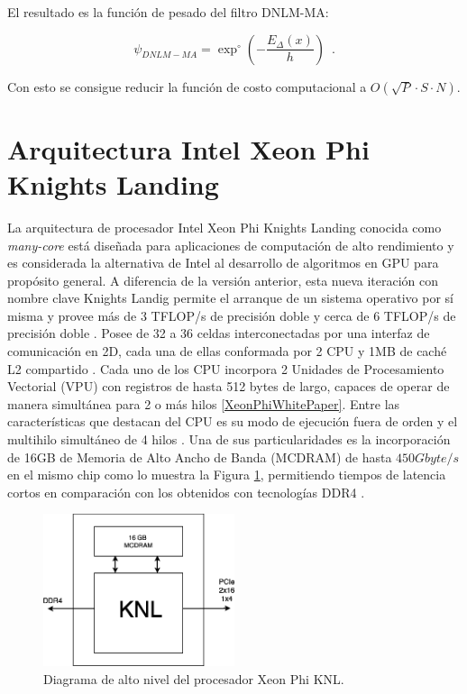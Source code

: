 {El resultado es la funci\'on de pesado del filtro DNLM-MA: 

\begin{equation}
\psi_{DNLM-MA}=\exp^{\circ}\left(-\frac{ E_\Delta\left(x\right) }{h}\right)  \enspace .
\label{eq:wmoas}
\end{equation}


Con esto se consigue reducir la  funci\'on de costo computacional a $O(\sqrt{P} \cdot S \cdot N)$.  



\section{Arquitectura Intel Xeon Phi Knights Landing}
\label{ch:marco_xeonphi}

La arquitectura de procesador Intel Xeon Phi Knights Landing conocida como \textit{many-core} est\'a dise\~nada para aplicaciones de computaci\'on de alto rendimiento y es considerada la alternativa de Intel al desarrollo de algoritmos en GPU para prop\'osito general. A diferencia de la versi\'on anterior, esta nueva iteraci\'on con nombre clave Knights Landig permite el arranque de un sistema operativo por s\'i misma y provee m\'as de 3 TFLOP/s de precisi\'on doble y cerca de 6 TFLOP/s de precisi\'on doble \cite{Jeffers201663}. Posee de 32 a 36 celdas interconectadas por una interfaz de comunicaci\'on en 2D, cada una de ellas conformada por 2 CPU y 1MB de cach\'e L2 compartido \cite{XeonPhiWhitePaper}. Cada uno de los CPU incorpora 2 Unidades de Procesamiento Vectorial (VPU) con registros de hasta 512 bytes de largo, capaces de operar de manera simult\'anea para 2 o m\'as hilos \ref{XeonPhiWhitePaper}. 
Entre las caracter\'isticas que destacan del CPU es su modo de ejecuci\'on fuera de orden y el multihilo simult\'aneo de 4 hilos \cite{XeonPhiWhitePaper}. Una de sus particularidades es la incorporaci\'on de 16GB de Memoria de Alto Ancho de Banda (MCDRAM) de hasta $450 Gbyte/s$ en el mismo chip como lo muestra la Figura \ref{fig:cpu_phi}, permitiendo tiempos de latencia cortos en comparaci\'on con los obtenidos con tecnolog\'ias DDR4 \cite{XeonPhiWhitePaper}.

\begin{figure}
\centering
\includegraphics[width=0.5\textwidth]{fig/cpu}
\caption{Diagrama de alto nivel del procesador Xeon Phi KNL.}
\label{fig:cpu_phi}
\end{figure}


}
